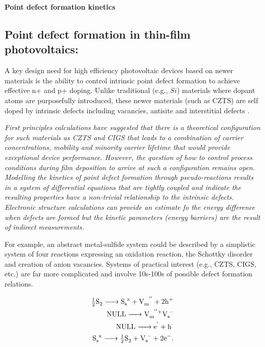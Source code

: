 \documentclass[11pt]{article}
\begin{document}
\begin{center}
{\Large{\textbf{Point defect formation kinetics}}}
\end{center}

 
\subsection*{Point defect formation in thin-film photovoltaics:}
A key design need for high efficiency photovoltaic devices based on
newer materials is the ability to control intrinsic point defect
formation to achieve effective n+ and p+ doping. Unlike traditional
(e.g., $Si$) materials where dopant atoms are purposefully introduced,
these newer materials (such as CZTS) are self doped by intrinsic
defects including vacancies, antisite and interstitial defects
\cite{JiangY13}.

{\it First principles calculations have suggested that there is a
  theoretical configuration for such materials as CZTS and CIGS that
  leads to a combination of carrier concentrations, mobility and
  minority carrier lifetime that would provide exceptional device
  performance. However, the question of how to control process
  conditions during film deposition to arrive at such a configuration
  remains open. Modelling the kinetics of point defect formation
  through pseudo-reactions results in a system of differential
  equations that are tightly coupled and indicate the resulting
  properties have a non-trivial relationship to the intrinsic
  defects.  Electronic structure calculations can provide an estimate
  fo the energy difference when defects are formed but the kinetic
  parameters (energy barriers) are the result of indirect measurements.}

For example, an abstract metal-sulfide system could be described by a
simplistic system of four reactions expressing an oxidation reaction,
the Schottky disorder and creation of anion vacancies. Systems of
practical interest (e.g., CZTS, CIGS, etc.) are far more complicated
and involve 10s-100s of possible defect formation relations.

\begin{eqnarray*}
\ce{ \tfrac{1}{2} S2 -> S_s^x + V_m^{''} + 2 h^+ } \\
\ce{ NULL -> V_m^{''}+ V_s^{$\cdot \cdot$} } \\
\ce{ NULL -> e^' + h^{$\cdot$} } \\
\ce{ S_s^x -> \tfrac{1}{2} S2 + V_s^{$\cdot \cdot$} + 2 e^- }.
\end{eqnarray*}
\end{document}
